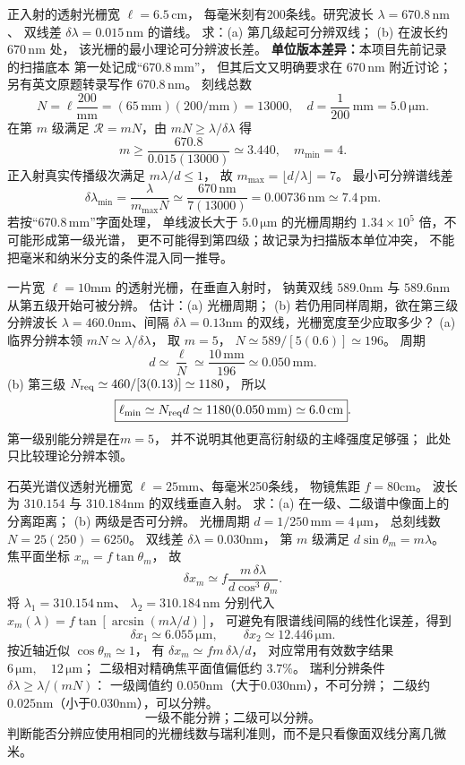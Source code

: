 正入射的透射光栅宽 $\ell=6.5\,\mathrm{cm}$，
每毫米刻有200条线。研究波长
$\lambda=670.8\,\mathrm{nm}$、
双线差 $\delta\lambda=0.015\,\mathrm{nm}$ 的谱线。
求：(a) 第几级起可分辨双线；
(b) 在波长约 $670\,\mathrm{nm}$ 处，
该光栅的最小理论可分辨波长差。
\textbf{单位版本差异：}本项目先前记录的扫描底本
第一处记成“$670.8\,\mathrm{mm}$”，
但其后文又明确要求在 $670\,\mathrm{nm}$ 附近讨论；
另有英文原题转录写作 $670.8\,\mathrm{nm}$。
\exsolution
刻线总数
\[
 N=\ell\frac{200}{\mathrm{mm}}
 =(65\,\mathrm{mm})(200/\mathrm{mm})
 =13000,
 \quad
 d=\frac{1}{200}\,\mathrm{mm}=5.0\,\mathrm{\mu m}.
\]
在第 $m$ 级满足 $\mathcal R=mN$，由
$mN\ge\lambda/\delta\lambda$ 得
\[
 m\ge\frac{670.8}{0.015(13000)}
 \simeq3.440,
 \quad\boxed{m_{\min}=4}.
\]
正入射真实传播级次满足
$m\lambda/d\le1$，
故 $m_{\max}=\lfloor d/\lambda\rfloor=7$。
最小可分辨谱线差
\[
 \boxed{\delta\lambda_{\min}
 =\frac{\lambda}{m_{\max}N}
 \simeq\frac{670\,\mathrm{nm}}{7(13000)}
 =0.00736\,\mathrm{nm}
 \simeq7.4\,\mathrm{pm}}.
\]
\excheck
若按“$670.8\,\mathrm{mm}$”字面处理，
单线波长大于 $5.0\,\mathrm{\mu m}$ 的光栅周期约
$1.34\times10^5$ 倍，不可能形成第一级光谱，
更不可能得到第四级；故记录为扫描版本单位冲突，
不能把毫米和纳米分支的条件混入同一推导。

一片宽
$\ell=10$mm 的透射光栅，在垂直入射时，
钠黄双线 $589.0$nm 与 $589.6$nm 从第五级开始可被分辨。
估计：(a) 光栅周期；
(b) 若仍用同样周期，欲在第三级分辨波长
$\lambda=460.0$nm、间隔
$\delta\lambda=0.13$nm 的双线，光栅宽度至少应取多少？
\exsolution
(a) 临界分辨本领
$mN\simeq\lambda/\delta\lambda$，
取 $m=5$，
$N\simeq589/[5(0.6)]\simeq196$。
周期
\[
\boxed{d\simeq\frac{\ell}{N}
\simeq\frac{10\,\mathrm{mm}}{196}
\simeq0.050\,\mathrm{mm}}.
\]
(b) 第三级
$N_{\rm req}\simeq460/[3(0.13)]
\simeq1180$，
所以
\[
\boxed{\ell_{\min}\simeq N_{\rm req}d
\simeq1180(0.050\,\mathrm{mm})
\simeq6.0\,\mathrm{cm}}.
\]
\excheck 第一级别能分辨是在$m=5$，
并不说明其他更高衍射级的主峰强度足够强；
此处只比较理论分辨本领。

石英光谱仪透射光栅宽
$\ell=25$mm、每毫米250条线，
物镜焦距
$f=80$cm。
波长为 $310.154$ 与
$310.184$nm 的双线垂直入射。
求：(a) 在一级、二级谱中像面上的分离距离；
(b) 两级是否可分辨。
\exsolution
光栅周期
$d=1/250\,\mathrm{mm}=4\,\mathrm{\mu m}$，
总刻线数
$N=25(250)=6250$。
双线差
$\delta\lambda=0.030$nm，
第 $m$ 级满足
$d\sin\theta_m=m\lambda$。
焦平面坐标 $x_m=f\tan\theta_m$，
故
\[
\delta x_m\simeq
f\frac{m\,\delta\lambda}{d\cos^3\theta_m}.
\]
将 $\lambda_1=310.154\,\mathrm{nm}$、
$\lambda_2=310.184\,\mathrm{nm}$ 分别代入
$x_m(\lambda)=f\tan[\arcsin(m\lambda/d)]$，
可避免有限谱线间隔的线性化误差，得到
\[
 \boxed{\delta x_1\simeq6.055\,\mathrm{\mu m}},
 \qquad
 \boxed{\delta x_2\simeq12.446\,\mathrm{\mu m}}.
\]
按近轴近似 $\cos\theta_m\simeq1$，
有 $\delta x_m\simeq fm\,\delta\lambda/d$，
对应常用有效数字结果
$\boxed{6\,\mathrm{\mu m},\quad12\,\mathrm{\mu m}}$；
二级相对精确焦平面值偏低约 $3.7\%$。
瑞利分辨条件
$\delta\lambda\ge\lambda/(mN)$：
一级阈值约 $0.050$nm（大于0.030nm），不可分辨；
二级约 $0.025$nm（小于0.030nm），可以分辨。
\[
\boxed{\text{一级不能分辨；二级可以分辨。}}
\]
\excheck 判断能否分辨应使用相同的光栅线数与瑞利准则，而不是只看像面双线分离几微米。

